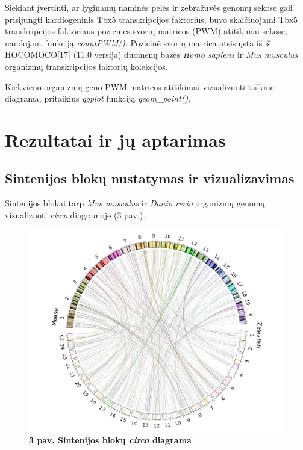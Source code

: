 \documentclass[12pt]{article}
\begin{document}
Siekiant įvertinti, ar lyginamų naminės pelės ir zebražuvės genomų sekose gali
prisijungti kardiogeninis Tbx5 transkripcijos faktorius, buvo skaičiuojami Tbx5
transkripcijos faktoriaus pozicinės svorių matricos (PWM) atitikimai sekose,
naudojant funkciją \emph{countPWM()}. Pozicinė svorių matrica atsisiųsta iš
iš HOCOMOCO[17] (11.0 versija) duomenų bazės \emph{Homo sapiens} ir
\emph{Mus musculus} organizmų transkripcijos faktorių kolekcijos.

Kiekvieno organizmų geno PWM matricos atitikimai vizualizuoti taškine diagrama,
pritaikius \emph{ggplot} funkciją \emph{geom\_point()}.

\newpage


\section{Rezultatai ir jų aptarimas}
\subsection{Sintenijos blokų nustatymas ir vizualizavimas}

Sintenijos blokai tarp \emph{Mus musculus} ir \emph{Danio rerio} organizmų
genomų vizualizuoti \emph{circo} diagramoje (3 pav.).

\begin{figure}[htb]
    \begin{center}
        \includegraphics[width=0.8\linewidth]{../Figures/SynCircos.png}
        \vspace{-1\baselineskip}
        \caption*{\small\textbf{3 pav. Sintenijos blokų \emph{circo}
        diagrama}}
        \label{fig:birds}
    \end{center}
\end{figure}
\end{document}

